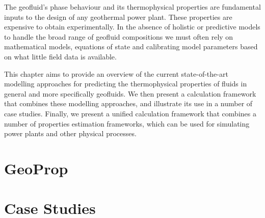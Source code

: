 The geofluid's phase behaviour and its thermophysical properties are fundamental inputs to the design of any geothermal power plant. These properties are expensive to obtain experimentally. In the absence of holistic or predictive models to handle the broad range of geofluid compositions we must often rely on mathematical models, equations of state and calibrating model parameters based on what little field data is available.

This chapter aims to provide an overview of the current state-of-the-art modelling approaches for predicting the thermophysical properties of fluids in general and more specifically geofluids. We then present a calculation framework that combines these modelling approaches, and illustrate its use in a number of case studies. Finally, we present a unified calculation framework that combines a number of properties estimation frameworks, which can be used for simulating power plants and other physical processes.   

\label{sec:tppm_lit_review}


\section{GeoProp}
\label{sec:tppm_geoprop}
    

%     

\section{Case Studies}
\label{sec_tppm_case_study}
    



